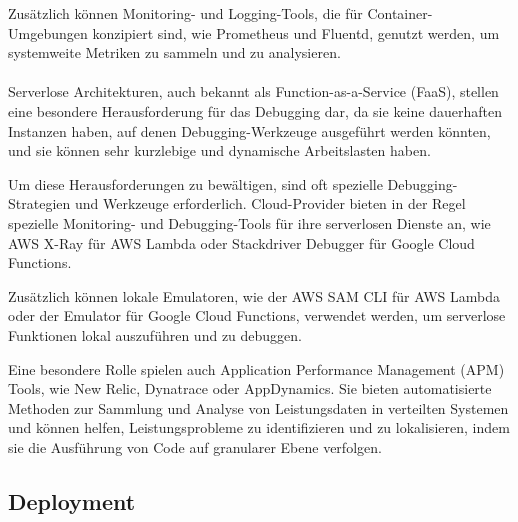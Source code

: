 \documentclass[../vs-script-first-v01.tex]{subfiles}
\begin{document}
Zusätzlich können Monitoring- und Logging-Tools, die für Container-Umgebungen konzipiert sind, wie Prometheus und Fluentd, genutzt werden, um systemweite Metriken zu sammeln und zu analysieren.
\\\\
Serverlose Architekturen, auch bekannt als Function-as-a-Service (FaaS), stellen eine besondere Herausforderung für das Debugging dar, da sie keine dauerhaften Instanzen haben, auf denen Debugging-Werkzeuge ausgeführt werden könnten, und sie können sehr kurzlebige und dynamische Arbeitslasten haben.

Um diese Herausforderungen zu bewältigen, sind oft spezielle Debugging-Strategien und Werkzeuge erforderlich. Cloud-Provider bieten in der Regel spezielle Monitoring- und Debugging-Tools für ihre serverlosen Dienste an, wie AWS X-Ray für AWS Lambda oder Stackdriver Debugger für Google Cloud Functions.

Zusätzlich können lokale Emulatoren, wie der AWS SAM CLI für AWS Lambda oder der Emulator für Google Cloud Functions, verwendet werden, um serverlose Funktionen lokal auszuführen und zu debuggen.

Eine besondere Rolle spielen auch Application Performance Management (APM) Tools, wie New Relic, Dynatrace oder AppDynamics. Sie bieten automatisierte Methoden zur Sammlung und Analyse von Leistungsdaten in verteilten Systemen und können helfen, Leistungsprobleme zu identifizieren und zu lokalisieren, indem sie die Ausführung von Code auf granularer Ebene verfolgen.

\subsection{Deployment}
\end{document}
